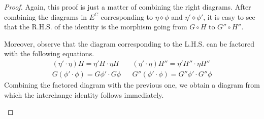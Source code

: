 \documentclass{article}
\theoremstyle{definition}
\theoremstyle{remark}
\begin{document}
\begin{proof}
	Again, this proof is just a matter of combining the right diagrams. After combining the diagrams in $E^C$ corresponding to $\eta \diamond \phi$ and $\eta'\diamond \phi'$, it is easy to see that the R.H.S. of the identity is the morphism going from $G\circ H$ to $G''\circ H''$.
	\begin{figure}[H]
		\centering
	\end{figure}

	Moreover, observe that the diagram corresponding to the L.H.S. can be factored with the following equations.
	\begin{align*}
	(\eta'\cdot \eta)H = \eta'H\cdot \eta H && (\eta'\cdot \eta)H'' = \eta'H''\cdot \eta H''\\
	G(\phi'\cdot \phi) = G\phi'\cdot G\phi && G''(\phi'\cdot \phi) = G''\phi'\cdot G''\phi
	\end{align*}
	Combining the factored diagram with the previous one, we obtain a diagram from which the interchange identity follows immediately.
	\begin{figure}[h]
		\centering
	\end{figure}
\end{proof}
\end{document}
